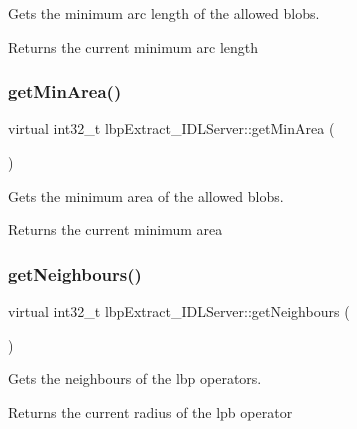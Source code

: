 Gets the minimum arc length of the allowed blobs. 

\begin{DoxyReturn}{Returns}
the current minimum arc length 
\end{DoxyReturn}
\mbox{\label{classlbpExtract__IDLServer_a3f6f2aba33eeb0a15d73fdfc5817ef7a}} 
\subsubsection{\texorpdfstring{getMinArea()}{getMinArea()}}
{\footnotesize\ttfamily virtual int32\+\_\+t lbp\+Extract\+\_\+\+I\+D\+L\+Server\+::get\+Min\+Area (\begin{DoxyParamCaption}{ }\end{DoxyParamCaption})\hspace{0.3cm}{\ttfamily [virtual]}}



Gets the minimum area of the allowed blobs. 

\begin{DoxyReturn}{Returns}
the current minimum area 
\end{DoxyReturn}
\mbox{\label{classlbpExtract__IDLServer_abf7693b9f3f63c2a16e163a3991b7d01}} 
\subsubsection{\texorpdfstring{getNeighbours()}{getNeighbours()}}
{\footnotesize\ttfamily virtual int32\+\_\+t lbp\+Extract\+\_\+\+I\+D\+L\+Server\+::get\+Neighbours (\begin{DoxyParamCaption}{ }\end{DoxyParamCaption})\hspace{0.3cm}{\ttfamily [virtual]}}



Gets the neighbours of the lbp operators. 

\begin{DoxyReturn}{Returns}
the current radius of the lpb operator 
\end{DoxyReturn}
\mbox{\label{classlbpExtract__IDLServer_a48094f72a89aa3218e3449dfe071f0f7}} 
